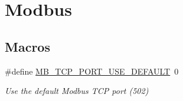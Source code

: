 \hypertarget{group__modbus}{}\section{Modbus}
\label{group__modbus}
\subsection*{Macros}
\begin{DoxyCompactItemize}
\item 
\#define \hyperlink{group__modbus_ga0e6d79d4ff38dbf7d3fd81a80d655b70}{M\+B\+\_\+\+T\+C\+P\+\_\+\+P\+O\+R\+T\+\_\+\+U\+S\+E\+\_\+\+D\+E\+F\+A\+U\+LT}~0\hypertarget{group__modbus_ga0e6d79d4ff38dbf7d3fd81a80d655b70}{}\label{group__modbus_ga0e6d79d4ff38dbf7d3fd81a80d655b70}

\begin{DoxyCompactList}\small\item\em Use the default Modbus T\+CP port (502) \end{DoxyCompactList}\end{DoxyCompactItemize}
